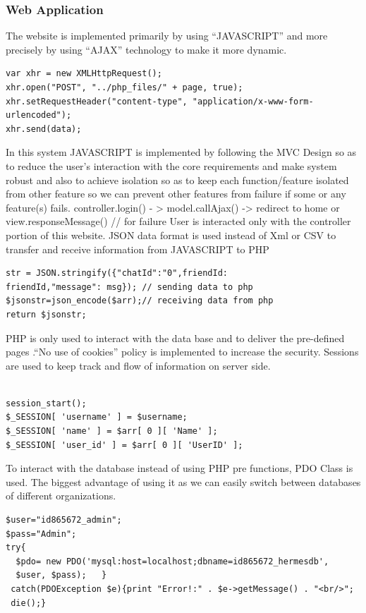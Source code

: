 \documentclass{article}
\begin{document}
\subsubsection{Web Application}
The website is implemented primarily by using “JAVASCRIPT” and more precisely by using “AJAX” technology to make it more dynamic.
\begin{lstlisting}
var xhr = new XMLHttpRequest();
xhr.open("POST", "../php_files/" + page, true);
xhr.setRequestHeader("content-type", "application/x-www-form-urlencoded");
xhr.send(data);
\end{lstlisting}
In this system JAVASCRIPT is implemented by following the MVC Design so as to reduce the user’s interaction with the core requirements and make system robust and also to achieve isolation so as to keep each function/feature isolated from other feature so we can prevent other features from failure if some or any feature(s) fails.
controller.login() - > model.callAjax() -> redirect to home or view.responseMessage() // for failure
User is interacted only with the controller portion of this website.
JSON data format is used instead of Xml or CSV to transfer  and receive information from JAVASCRIPT to PHP
\begin{lstlisting}
str = JSON.stringify({"chatId":"0",friendId: 
friendId,"message": msg}); // sending data to php
$jsonstr=json_encode($arr);// receiving data from php
return $jsonstr;

\end{lstlisting}

PHP is only used to interact with the data base and to deliver the pre-defined pages .“No use of cookies” policy is implemented to increase the security. Sessions are used to keep track and flow of information on server side. 
\begin{lstlisting}

session_start();
$_SESSION[ 'username' ] = $username;
$_SESSION[ 'name' ] = $arr[ 0 ][ 'Name' ];
$_SESSION[ 'user_id' ] = $arr[ 0 ][ 'UserID' ];
\end{lstlisting}

To interact with the database instead of using PHP pre functions, PDO Class is used. The biggest advantage of using it as we can easily switch between databases of different organizations. 
\begin{lstlisting}
$user="id865672_admin";
$pass="Admin";
try{
  $pdo= new PDO('mysql:host=localhost;dbname=id865672_hermesdb',
  $user, $pass);   }
 catch(PDOException $e){print "Error!:" . $e->getMessage() . "<br/>";
 die();} 
 
\end{lstlisting}
\end{document}
